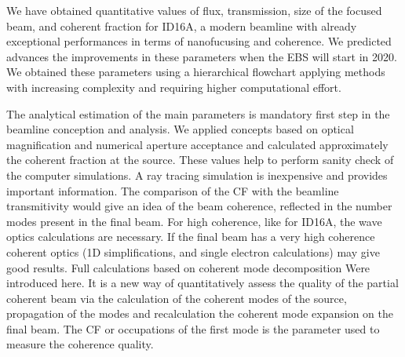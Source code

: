 \documentclass{iucr}              %
\newcommand{\todo}[1]{{\color{red}[TODO: "#1'']}}
\begin{document}
We have obtained quantitative values of flux, transmission, size of the focused beam, and coherent fraction for ID16A, a modern beamline with already exceptional performances in terms of nanofucusing and coherence. We predicted advances the improvements in these parameters when the EBS will start in 2020. We obtained these parameters using a hierarchical flowchart applying methods with increasing complexity and requiring higher computational effort. 

The analytical estimation of the main parameters is mandatory first step in the beamline conception and analysis. We applied concepts based on optical magnification and numerical aperture acceptance and calculated approximately the coherent fraction at the source. These values help to perform sanity check of the computer simulations. A ray tracing simulation is inexpensive and provides important information. The comparison of the CF with the beamline transmitivity would give an idea of the beam coherence, reflected in the number modes present in the final beam. For high coherence, like for ID16A, the wave optics calculations are necessary. If the final beam has a very high coherence coherent optics (1D simplifications, and single electron calculations) may give good results. Full calculations based on coherent mode decomposition Were introduced here. It is a new way of quantitatively assess the quality of the partial coherent beam via the calculation of the coherent modes of the source, propagation of the modes and recalculation the coherent mode expansion on the final beam. The CF or occupations of the first mode is the parameter used to measure the coherence quality. 




% 
% 
\end{document}

